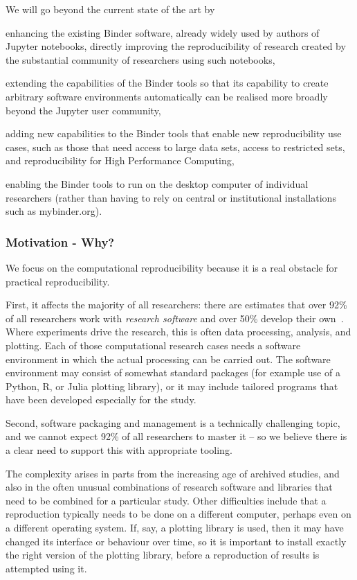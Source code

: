 We will go beyond the current state of the art by
\begin{compactitem}
\item enhancing the existing Binder software, already widely used by authors of Jupyter notebooks,
  directly improving the reproducibility of research created by the substantial
  community of researchers using such notebooks,
\item extending the capabilities of the Binder tools so that its capability to
  create arbitrary software environments automatically can be realised more broadly beyond the
  Jupyter user community,
\item adding new capabilities to the Binder tools that enable new reproducibility
  use cases, such as those that need access to large data sets, access to restricted sets,
  and reproducibility for High Performance Computing,
\item enabling the Binder tools to run on the desktop computer of individual
  researchers (rather than having to rely on central or institutional
  installations such as mybinder.org).
\end{compactitem}

\subsubsection{Motivation - Why?}\label{sec:motivation-why}

We focus on the computational reproducibility because it is a real
obstacle for practical reproducibility.

First, it affects the majority of all researchers: there are estimates that over 92\%
of all researchers work with \emph{research software} and over 50\% develop
their own~\cite{Hettrick2014}. Where experiments drive the research, this is
often data processing, analysis, and plotting. Each of those computational
research cases needs a software environment in which the actual processing can
be carried out. The software environment may consist of somewhat standard packages (for example
use of a Python, R, or Julia plotting library), or it may include tailored
programs that have been developed especially for the study.

Second, software packaging and management is a technically challenging topic,
and we cannot expect 92\% of all researchers to master it -- so we believe there
is a clear need to support this with appropriate tooling.

The complexity arises in parts from the increasing age of archived studies, and
also in the often unusual combinations of research software and libraries that
need to be combined for a particular study. Other difficulties include that a
reproduction typically needs to be done on a different computer, perhaps even on
a different operating system. If, say, a plotting library is used, then it may
have changed its interface or behaviour over time, so it is important to install
exactly the right version of the plotting library, before a reproduction of
results is attempted using it.

